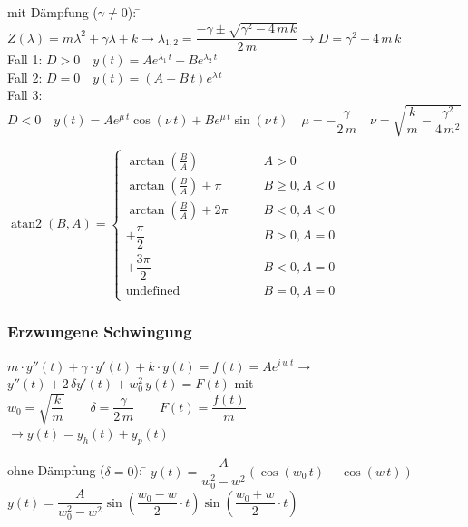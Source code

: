 \begin{tabbing}
mit Dämpfung ($\gamma \neq 0$): \= $Z(\lambda)=m\lambda^2 + \gamma \lambda + k \rightarrow \lambda_{1,2}=\dfrac{-\gamma \pm \sqrt{\gamma^2 - 4 \, m \, k}}{2 \, m} \rightarrow D=\gamma^2 - 4 \, m \, k$\\
\> Fall 1: $D>0 \quad y(t)=Ae^{\lambda_1 \, t} + Be^{\lambda_2 \, t}$\\
\> Fall 2: $D=0 \quad y(t)=(A + B \,t)e^{\lambda \, t}$\\
\> Fall 3: $D<0 \quad y(t)=Ae^{\mu \, t}\cos(\nu \, t) + Be^{\mu \, t}\sin(\nu \, t) \quad \mu=-\dfrac{\gamma}{2\,m} \quad \nu = \sqrt{\dfrac{k}{m}-\dfrac{\gamma^2}{4 \, m^2}}$
\end{tabbing}

$\operatorname{atan2}(B, A) = \begin{cases}
\arctan\left(\frac B A\right) & \qquad A > 0 \\
\arctan\left(\frac B A\right) + \pi& \qquad B \ge 0 , A < 0 \\
\arctan\left(\frac B A\right) + 2\pi& \qquad B < 0 , A < 0 \\
+\dfrac{\pi}{2} & \qquad B > 0 , A = 0 \\
+\dfrac{3\pi}{2} & \qquad B < 0 , A = 0 \\
\text{undefined} & \qquad B = 0, A = 0
\end{cases}$

\subsubsection{Erzwungene Schwingung}
$m \cdot y''(t) + \gamma\cdot y'(t) + k \cdot y(t) = f(t)=Ae^{i\,w\,t} \rightarrow$\\
$ y''(t) + 2 \, \delta y'(t) + w_0^2 \, y(t) = F(t)$ \qquad mit \quad $w_0=\sqrt{\dfrac{k}{m}} \qquad \delta=\dfrac{\gamma}{2\,m} \qquad F(t)=\dfrac{f(t)}{m}$\\
$\rightarrow y(t)=y_h(t)+y_p(t)$

\begin{tabbing}
ohne Dämpfung ($\delta = 0$): \= $y(t) = \dfrac{A}{w_0^2-w^2}(\cos(w_0\,t)-\cos(w\,t))$\\
\> $y(t) = \dfrac{A}{w_0^2-w^2}\sin(\dfrac{w_0-w}{2} \cdot t)\sin(\dfrac{w_0+w}{2} \cdot t)$\\
\end{tabbing}

